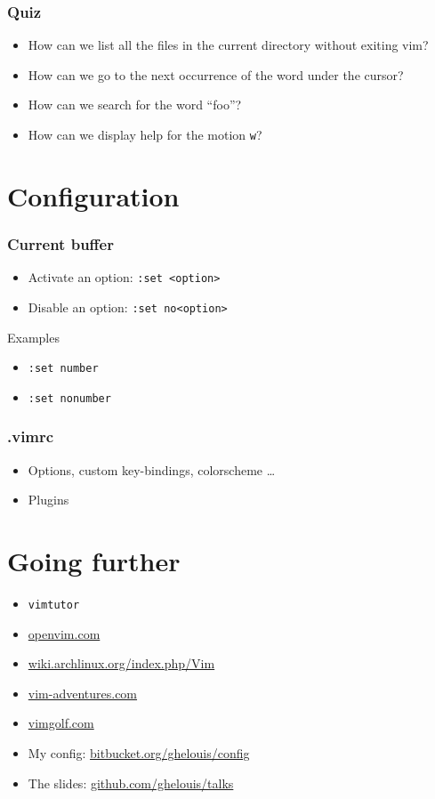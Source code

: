 \documentclass{beamer}
\begin{document}
\begin{frame} \frametitle{Quiz}
  \begin{itemize}
    \item How can we list all the files in the current directory without
      exiting vim?  \pause
    \item How can we go to the next occurrence of the word under the cursor?
      \pause {\tt *} \pause
    \item How can we search for the word ``foo''?  \pause
    \item How can we display help for the motion {\tt w}? 
  \end{itemize}
\end{frame}


\section{Configuration}
\begin{frame} \frametitle{Current buffer}
  \begin{itemize}
    \item Activate an option: {\tt :set <option>}
    \item Disable an option: {\tt :set no<option>}
  \end{itemize}
  \pause
  \begin{block}{Examples}
    \begin{itemize}
      \item {\tt :set number}
      \item {\tt :set nonumber}
    \end{itemize}
  \end{block}
\end{frame}
\begin{frame} \frametitle{.vimrc}
  \begin{itemize}
    \item Options, custom key-bindings, colorscheme \dots
    \item Plugins
  \end{itemize}
  \pause
\end{frame}

\section{Going further}
\begin{frame}
  \begin{itemize}
    \item {\tt vimtutor}
    \item \href{http://www.openvim.com/}{openvim.com}
    \item \href{https://wiki.archlinux.org/index.php/Vim}{wiki.archlinux.org/index.php/Vim}
    \item \href{https://vim-adventures.com/}{vim-adventures.com}
    \item \href{https://vimgolf.com/}{vimgolf.com}
  \end{itemize}
\end{frame}

\begin{frame}
  \begin{itemize}
    \item My config: \href{https://bitbucket.org/ghelouis/config}{bitbucket.org/ghelouis/config}
    \item The slides: \href{https://github.com/ghelouis/talks}{github.com/ghelouis/talks}
  \end{itemize}
\end{frame}
\end{document}
